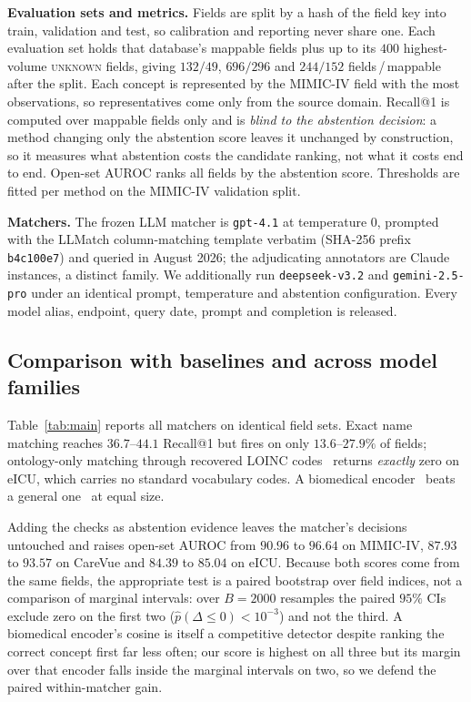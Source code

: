 \noindent\textbf{Evaluation sets and metrics.}
Fields are split by a hash of the field key into train, validation and test, so
calibration and reporting never share one. Each evaluation set holds that database's mappable fields plus
up to its $400$ highest-volume \textsc{unknown} fields, giving $132/49$, $696/296$ and
$244/152$ fields\,/\,mappable after the split. Each concept is represented by the
MIMIC-IV field with the most observations, so representatives come only from the source
domain. Recall@1 is computed over mappable fields only and is \emph{blind to the
abstention decision}: a method changing only the abstention score leaves it unchanged by
construction, so it measures what abstention costs the candidate ranking, not what it
costs end to end. Open-set AUROC ranks all fields by the abstention score. Thresholds are
fitted per method on the MIMIC-IV validation split.

\noindent\textbf{Matchers.}
The frozen LLM matcher is \texttt{gpt-4.1} at temperature $0$, prompted with the LLMatch
column-matching template verbatim (SHA-256 prefix \texttt{b4c100e7}) and queried in
August 2026; the adjudicating annotators are Claude instances, a distinct family. We
additionally run \texttt{deepseek-v3.2} and \texttt{gemini-2.5-pro} under an identical
prompt, temperature and abstention configuration. Every model alias, endpoint, query
date, prompt and completion is released.

\subsection{Comparison with baselines and across model families}

Table~\ref{tab:main} reports all matchers on identical field sets. Exact name matching
reaches $36.7$--$44.1$ Recall@1 but fires on only $13.6$--$27.9\%$ of fields;
ontology-only matching through recovered LOINC codes~\cite{loinc} returns \emph{exactly}
zero on eICU, which carries no standard vocabulary codes. A biomedical
encoder~\cite{sapbert} beats a general one~\cite{cpack} at equal size.

Adding the checks as abstention evidence leaves the matcher's decisions untouched and
raises open-set AUROC from $90.96$ to $96.64$ on MIMIC-IV, $87.93$ to $93.57$ on CareVue
and $84.39$ to $85.04$ on eICU. Because both scores come from the same fields, the
appropriate test is a paired bootstrap over field indices, not a comparison of marginal
intervals: over $B{=}2000$ resamples the paired $95\%$ CIs exclude zero on the first two
($\hat p(\Delta\le 0)<10^{-3}$) and not the third. A biomedical encoder's cosine is itself
a competitive detector despite ranking the correct concept first far less often; our score
is highest on all three but its margin over that encoder falls inside the marginal
intervals on two, so we defend the paired within-matcher gain.


